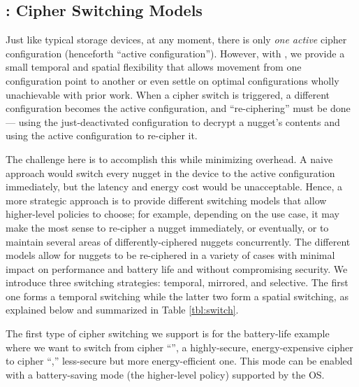 \subsection{\sysA: Cipher Switching Models}\label{subsec:des-switch}

Just like typical storage devices, at any moment, there is only {\em one active}
cipher configuration (henceforth ``active configuration''). However, with \sysA,
we provide a small temporal and spatial flexibility that allows movement from
one configuration point to another or even settle on optimal configurations
wholly unachievable with prior work. When a cipher switch is triggered, a
different configuration becomes the active configuration, and ``re-ciphering''
must be done --- using the just-deactivated configuration to decrypt a nugget's
contents and using the active configuration to re-cipher it.

The challenge here is to accomplish this while minimizing overhead. A naive
approach would switch every nugget in the device to the active configuration
immediately, but the latency and energy cost would be unacceptable. Hence, a
more strategic approach is to provide different switching models that allow
higher-level policies to choose; for example, depending on the use case, it may
make the most sense to re-cipher a nugget immediately, or eventually, or to
maintain several areas of differently-ciphered nuggets concurrently. The
different models allow for nuggets to be re-ciphered in a variety of cases with
minimal impact on performance and battery life and without compromising
security. We introduce three switching strategies: temporal, mirrored, and
selective. The first one forms a temporal switching while the latter two form a
spatial switching, as explained below and summarized in Table \cref{tbl:switch}.




 The first type of cipher switching we support is for
the battery-life example where we want to switch from cipher ``\cone'', a
highly-secure, energy-expensive cipher to cipher ``\ctwo,'' less-secure but more
energy-efficient one. This mode can be enabled with a battery-saving mode (the
higher-level policy) supported by the OS.

